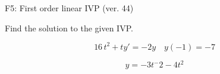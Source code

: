 \begin{exercise}
  \begin{exerciseTitle}F5: First order linear IVP (ver. 44)\end{exerciseTitle}
  \begin{exerciseStatement}
    
Find the solution to the given IVP.

    
\[16 \, t^{2} +ty'= -2 y \hspace{1em} y( -1 ) = -7\]

  \end{exerciseStatement}
  \begin{exerciseAnswer}
    
\[y= -3 t^ -2 -4 t^{2}\]

  \end{exerciseAnswer}
\end{exercise}